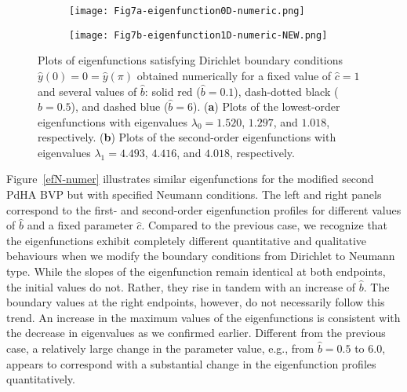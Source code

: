 \documentclass[symmetry,article,accept,moreauthors,pdftex,a4paper]{mdpi}
\begin{document}
\nointerlineskip
\begin{figure}[H]
\widefigure
\begin{subfigure}{0.45\textwidth}
\caption{} \vspace{0.1cm}
\texttt{[image: Fig7a-eigenfunction0D-numeric.png]}
\end{subfigure}	\hspace*{0.5cm}
\begin{subfigure}{0.45\textwidth}
\caption{} \vspace{0.1cm}
\texttt{[image: Fig7b-eigenfunction1D-numeric-NEW.png]}
\end{subfigure}
\caption{Plots of eigenfunctions satisfying Dirichlet boundary conditions $\widehat{y}(0) = 0 = \widehat{y}(\pi)$ obtained numerically for a fixed value of $\widehat{c} = 1$ and several values of $\widehat{b}$: solid red ($\widehat{b} = 0.1$), dash-dotted black ($\widehat{b} = 0.5$), and dashed blue ($\widehat{b} = 6$). (\textbf{a}) Plots of the lowest-order eigenfunctions with eigenvalues $\lambda_0 = 1.520$, $1.297$, and $1.018$, respectively. (\textbf{b}) Plots of the second-order eigenfunctions with eigenvalues $\lambda_1 = 4.493$, $4.416$, and $4.018$, respectively.}		\label{efD-numer}
\end{figure}
\begin{paracol}{2}
\switchcolumn

Figure~\ref{efN-numer} illustrates similar eigenfunctions for the modified second PdHA BVP but with specified Neumann conditions. The left and right panels correspond to the first- and second-order eigenfunction profiles for different values of $\widehat{b}$ and a fixed parameter $\widehat{c}$. Compared to the previous case, we recognize that the eigenfunctions exhibit completely different quantitative and qualitative behaviours when we modify the boundary conditions from Dirichlet to Neumann type. While the slopes of the eigenfunction remain identical at both endpoints, the initial values do not. Rather, they rise in tandem with an increase of $\widehat{b}$. The boundary values at the right endpoints, however, do not necessarily follow this trend. An increase in the maximum values of the eigenfunctions is consistent with the decrease in eigenvalues as we  confirmed earlier. Different from the previous case, a relatively large change in the parameter value, e.g., from $\widehat{b} = 0.5$ to $6.0$, appears to correspond with a substantial change in the eigenfunction profiles quantitatively.

\clearpage
\end{paracol}
\end{document}
